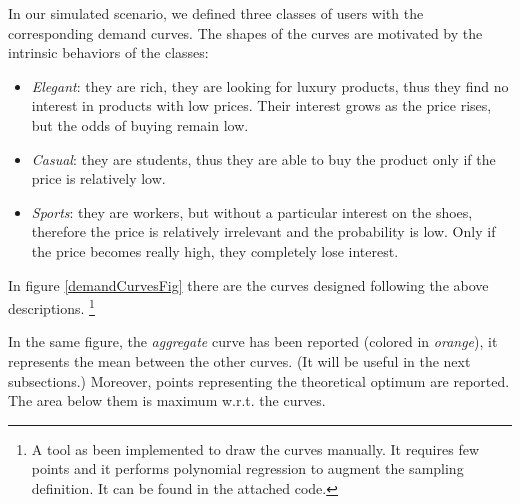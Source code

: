 In our simulated scenario, we defined three classes of users with the corresponding demand curves. The shapes of the curves are motivated by the intrinsic behaviors of the classes:
\begin{itemize}
    \item \textit{Elegant}: they are rich, they are looking for luxury products, thus they find no interest in products with low prices. Their interest grows as the price rises, but the odds of buying remain low.
    \item \textit{Casual}: they are students, thus they are able to buy the product only if the price is relatively low.
    \item \textit{Sports}: they are workers, but without a particular interest on the shoes, therefore the price is relatively irrelevant and the probability is low. Only if the price becomes really high, they completely lose interest.
\end{itemize}

In figure \ref{demandCurvesFig} there are the curves designed following the above descriptions.
\footnote{A tool as been implemented to draw the curves manually. It requires few points and it performs polynomial regression to augment the sampling definition. It can be found in the attached code.}

In the same figure, the \textit{aggregate} curve has been reported (colored in \textit{orange}), it represents the mean between the other curves. (It will be useful in the next subsections.)
Moreover, points representing the theoretical optimum are reported. The area below them is maximum w.r.t. the curves.

